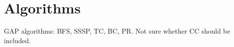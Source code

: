 \section{Algorithms}
\label{sec:algorithms}

GAP algorithms: BFS, SSSP, TC, BC, PR. Not sure whether CC should be included.

